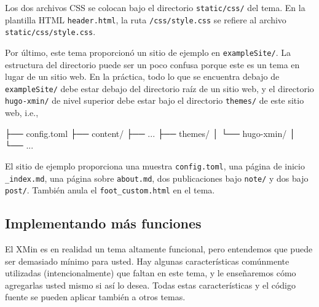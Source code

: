 \documentclass[12pt,]{krantz}
\makeatletter
\newenvironment{Shaded}{\begin{snugshade}}{\end{snugshade}}
\newcommand{\ExtensionTok}[1]{#1}
\newcommand{\NormalTok}[1]{#1}
\newenvironment{kframe}{%
\medskip{}
\setlength{\fboxsep}{.8em}
 \def\at@end@of@kframe{}%
 \ifinner\ifhmode%
  \def\at@end@of@kframe{\end{minipage}}%
  \begin{minipage}{\columnwidth}%
 \fi\fi%
 \def\FrameCommand##1{\hskip\@totalleftmargin \hskip-\fboxsep
 \colorbox{shadecolor}{##1}\hskip-\fboxsep
     \hskip-\linewidth \hskip-\@totalleftmargin \hskip\columnwidth}%
 \MakeFramed {\advance\hsize-\width
   \@totalleftmargin\z@ \linewidth\hsize
   \@setminipage}}%
 {\par\unskip\endMakeFramed%
 \at@end@of@kframe}
\renewenvironment{Shaded}{\begin{kframe}}{\end{kframe}}
\theoremstyle{definition}
\theoremstyle{definition}
\theoremstyle{definition}
\theoremstyle{remark}
\makeatother
\begin{document}
Los dos archivos CSS se colocan bajo el directorio \texttt{static/css/}
del tema. En la plantilla HTML \texttt{header.html}, la ruta
\texttt{/css/style.css} se refiere al archivo
\texttt{static/css/style.css}.

Por último, este tema proporcionó un sitio de ejemplo en
\texttt{exampleSite/}. La estructura del directorio puede ser un poco
confusa porque este es un tema en lugar de un sitio web. En la práctica,
todo lo que se encuentra debajo de \texttt{exampleSite/} debe estar
debajo del directorio raíz de un sitio web, y el directorio
\texttt{hugo-xmin/} de nivel superior debe estar bajo el directorio
\texttt{themes/} de este sitio web, i.e.,

\begin{Shaded}
\begin{Highlighting}[]
\NormalTok{├── }\ExtensionTok{config.toml}
\NormalTok{├── }\ExtensionTok{content/}
\NormalTok{├── }\ExtensionTok{...}
\NormalTok{├── }\ExtensionTok{themes/}
\NormalTok{│   └── }\ExtensionTok{hugo-xmin/}
\NormalTok{│}
\NormalTok{└── }\ExtensionTok{...}
\end{Highlighting}
\end{Shaded}

El sitio de ejemplo proporciona una muestra \texttt{config.toml}, una
página de inicio \texttt{\_index.md}, una página sobre
\texttt{about.md}, dos publicaciones bajo \texttt{note/} y dos bajo
\texttt{post/}. También anula el \texttt{foot\_custom.html} en el tema.

\hypertarget{how-to}{%
\subsection{Implementando más funciones}\label{how-to}}

El XMin es en realidad un tema altamente funcional, pero entendemos que
puede ser demasiado mínimo para usted. Hay algunas características
comúnmente utilizadas (intencionalmente) que faltan en este tema, y le
enseñaremos cómo agregarlas usted mismo si así lo desea. Todas estas
características y el código fuente se pueden aplicar también a otros
temas.
\end{document}
